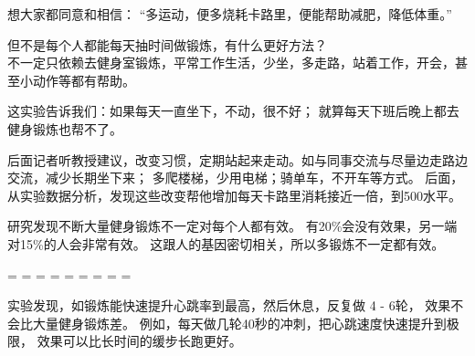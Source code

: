 想大家都同意和相信：
``多运动，便多烧耗卡路里，便能帮助减肥，降低体重。''



但不是每个人都能每天抽时间做锻炼，有什么更好方法？\\
不一定只依赖去健身室锻炼，平常工作生活，少坐，多走路，站着工作，开会，甚至小动作等都有帮助。


这实验告诉我们：如果每天一直坐下，不动，很不好；
就算每天下班后晚上都去健身锻炼也帮不了。

后面记者听教授建议，改变习惯，定期站起来走动。如与同事交流与尽量边走路边交流，减少长期坐下来；
多爬楼梯，少用电梯；骑单车，不开车等方式。
后面，从实验数据分析，发现这些改变帮他增加每天卡路里消耗接近一倍，到500水平。

研究发现不断大量健身锻炼不一定对每个人都有效。
有20\%会没有效果，另一端对15\%的人会非常有效。
这跟人的基因密切相关，所以多锻炼不一定都有效。

\begin{description}
\tightlist
\item[]
= = = = = = = = =
\end{description}

实验发现，如锻炼能快速提升心跳率到最高，然后休息，反复做 4 - 6轮，
效果不会比大量健身锻炼差。
例如，每天做几轮40秒的冲刺，把心跳速度快速提升到极限，
效果可以比长时间的缓步长跑更好。

